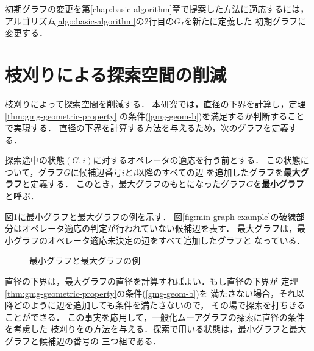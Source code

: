 初期グラフの変更を第\ref{chap:basic-algorithm}章で提案した方法に適応するには，
アルゴリズム\ref{algo:basic-algorithm}の2行目の$G_I$を新たに定義した
初期グラフに変更する．

\section{枝刈りによる探索空間の削減}
\label{sect:reduce-by-prune}
枝刈りによって探索空間を削減する．
本研究では，直径の下界を計算し，定理\ref{thm:gmg-geometric-property}
の条件(\ref{gmg-geom-b})を満足するか判断することで実現する．
直径の下界を計算する方法を与えるため，次のグラフを定義する．
\begin{definition}\rm
  探索途中の状態$(G,i)$に対するオペレータの適応を行う前とする．
  この状態について，グラフ$G$に候補辺番号$i$と$i$以降のすべての辺
  を追加したグラフを\textbf{最大グラフ}と定義する．
  このとき，最大グラフのもとになったグラフ$G$を\textbf{最小グラフ}と呼ぶ．
\end{definition}
\begin{example}\rm
  図\ref{fig:min-max-graph}に最小グラフと最大グラフの例を示す．
  図\ref{fig:min-graph-example}の破線部分はオペレータ適応の判定が行われていない候補辺を表す．
  最大グラフは，最小グラフのオペレータ適応未決定の辺をすべて追加したグラフと
  なっている．
\end{example}
\begin{figure}
  \centering
  \hfill
  \caption{最小グラフと最大グラフの例}
  \label{fig:min-max-graph}
\end{figure}
直径の下界は，最大グラフの直径を計算すればよい．もし直径の下界が
定理\ref{thm:gmg-geometric-property}の条件(\ref{gmg-geom-b})を
満たさない場合，それ以降どのように辺を追加しても条件を満たさないので，
その場で探索を打ちきることができる．
この事実を応用して，一般化ムーアグラフの探索に直径の条件を考慮した
枝刈りをの方法を与える．探索で用いる状態は，最小グラフと最大グラフと候補辺の番号の
三つ組である．

